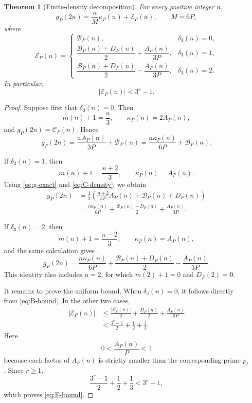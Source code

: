 \documentclass[12pt]{article}
\numberwithin{equation}{section}
\newtheorem{theorem}{Theorem}[section]
\theoremstyle{definition}
\theoremstyle{remark}
\newcommand{\Ccal}{\mathcal C}
\newcommand{\Ecal}{\mathcal E}
\newcommand{\Bcal}{\mathcal B}
\begin{document}
\begin{theorem}[Finite-density decomposition]
\label{thm:density-formula}
For every positive integer $n$,
\begin{equation}
\label{eq:density-formula}
g_P(2n)
=
\frac{n}{M}\kappa_P(n)+\Ecal_P(n),
\qquad
M=6P,
\end{equation}
where
\begin{equation}
\label{eq:E-branches}
\Ecal_P(n)
=
\begin{cases}
\Bcal_P(n),
&
\delta_3(n)=0,
\\[6pt]
\dfrac{\Bcal_P(n)+D_P(n)}{2}
+\dfrac{A_P(n)}{3P},
&
\delta_3(n)=1,
\\[10pt]
\dfrac{\Bcal_P(n)+D_P(n)}{2}
-\dfrac{A_P(n)}{3P},
&
\delta_3(n)=2.
\end{cases}
\end{equation}
In particular,
\begin{equation}
\label{eq:E-bound}
|\Ecal_P(n)|<3^r-1.
\end{equation}
\end{theorem}

\begin{proof}
Suppose first that $\delta_3(n)=0$. Then
\[
m(n)+1=\frac n3,
\qquad
\kappa_P(n)=2A_P(n),
\]
and $g_P(2n)=\Ccal_P(n)$. Hence
\[
g_P(2n)
=
\frac{nA_P(n)}{3P}+\Bcal_P(n)
=
\frac{n\kappa_P(n)}{6P}+\Bcal_P(n).
\]

If $\delta_3(n)=1$, then
\[
m(n)+1=\frac{n+2}{3},
\qquad
\kappa_P(n)=A_P(n).
\]
Using \eqref{eq:g-exact} and \eqref{eq:C-density}, we obtain
\begin{align*}
g_P(2n)
&=
\frac12
\left(
\frac{n+2}{3P}A_P(n)
+\Bcal_P(n)+D_P(n)
\right)
\\
&=
\frac{n\kappa_P(n)}{6P}
+
\frac{\Bcal_P(n)+D_P(n)}2
+
\frac{A_P(n)}{3P}.
\end{align*}

If $\delta_3(n)=2$, then
\[
m(n)+1=\frac{n-2}{3},
\qquad
\kappa_P(n)=A_P(n),
\]
and the same calculation gives
\[
g_P(2n)
=
\frac{n\kappa_P(n)}{6P}
+
\frac{\Bcal_P(n)+D_P(n)}2
-
\frac{A_P(n)}{3P}.
\]
This identity also includes $n=2$, for which
$m(2)+1=0$ and $D_P(2)=0$.

It remains to prove the uniform bound. When
$\delta_3(n)=0$, it follows directly from
\eqref{eq:B-bound}. In the other two cases,
\begin{align*}
|\Ecal_P(n)|
&\leq
\frac{|\Bcal_P(n)|}{2}
+\frac{D_P(n)}2
+\frac{A_P(n)}{3P}
\\
&<
\frac{3^r-1}{2}
+\frac12
+\frac13.
\end{align*}
Here
\[
0<\frac{A_P(n)}P<1
\]
because each factor of $A_P(n)$ is strictly smaller than the
corresponding prime $p_i$. Since $r\geq1$,
\[
\frac{3^r-1}{2}
+\frac12
+\frac13
<
3^r-1,
\]
which proves \eqref{eq:E-bound}.
\end{proof}
\end{document}
